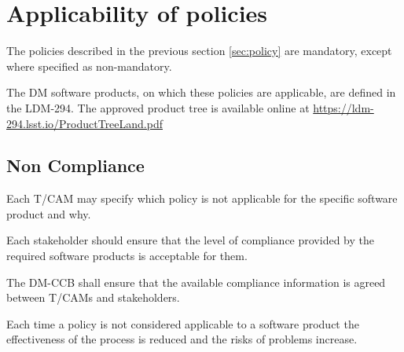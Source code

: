 \newpage
\section{Applicability of policies } \label{sec:applicability}

The policies described in the previous section \ref{sec:policy} are mandatory, except where specified as non-mandatory.

The \gls{DM} software products, on which these policies are applicable, are defined in the LDM-294.
The approved product tree is available online at \url{https://ldm-294.lsst.io/ProductTreeLand.pdf}



\subsection{Non Compliance} \label{sec:noncompliance}

Each T/CAM may  specify which policy is not applicable for the specific software product and why.

Each stakeholder should ensure that the level of compliance provided by the required software products is acceptable for them.

The DM-CCB shall ensure that the available compliance information is agreed between T/CAMs and stakeholders.

Each time a policy is not considered applicable to a software product the effectiveness of the process is reduced and the risks of problems increase.
